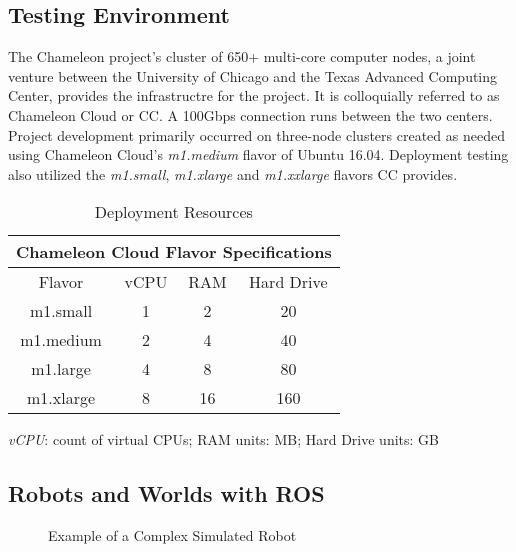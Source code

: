 \documentclass[9pt,twocolumn,twoside]{../../styles/osajnl}
\begin{document}
\subsection{Testing Environment}
The Chameleon project's cluster of 650+ multi-core computer nodes, a joint venture between the University of Chicago and the Texas Advanced Computing Center, provides the infrastructre for the project.  It is colloquially referred to as Chameleon Cloud or CC.  A 100Gbps connection runs between the two centers. Project development primarily occurred on three-node clusters created as needed using Chameleon Cloud's \textit{m1.medium} flavor of Ubuntu 16.04.  Deployment testing also utilized the \textit{m1.small}, \textit{m1.xlarge} and \textit{m1.xxlarge} flavors CC provides.  
\begin{table} [htbp]
  \begin{threeparttable}
  \centering
  \caption{Deployment Resources}
    \begin{tabular}{cccc}
      \multicolumn{4}{c}{\bf Chameleon Cloud Flavor Specifications}\\ \hline Flavor & vCPU & RAM & Hard Drive \\ \hline m1.small & 1 & 2 & 20\\ m1.medium & 2 & 4 & 40\\ m1.large & 4 & 8 & 80 \\ m1.xlarge & 8 & 16 & 160 \\ \hline
    \end{tabular}
    \begin{tablenotes}
      \small
      \item \textit{vCPU}: count of virtual CPUs; RAM units: MB; Hard Drive units: GB 
    \end{tablenotes}
  \end{threeparttable}
\end{table}

\subsection{Robots and Worlds with ROS}

\begin{figure}[htbp]
\centering
{}
\caption{Example of a Complex Simulated Robot}
\label{fig:complexRobot}
\end{figure}
\end{document}
